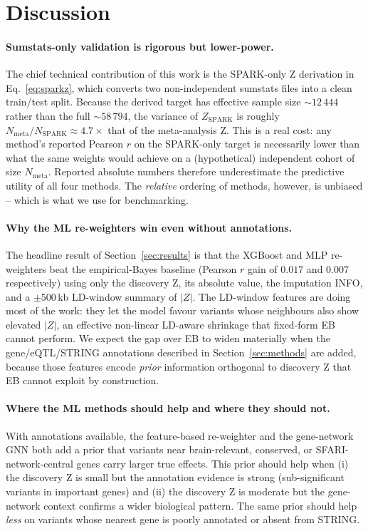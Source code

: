 \section{Discussion}
\label{sec:discussion}

\paragraph{Sumstats-only validation is rigorous but lower-power.}
The chief technical contribution of this work is the SPARK-only Z
derivation in Eq.~\ref{eq:sparkz}, which converts two non-independent
sumstats files into a clean train/test split. Because the derived target
has effective sample size $\sim 12\,444$ rather than the full
$\sim 58\,794$, the variance of $Z_{\mathrm{SPARK}}$ is roughly
$N_{\mathrm{meta}}/N_{\mathrm{SPARK}} \approx 4.7\times$ that of the
meta-analysis Z. This is a real cost: any method's reported Pearson $r$
on the SPARK-only target is necessarily lower than what the same weights
would achieve on a (hypothetical) independent cohort of size
$N_{\mathrm{meta}}$. Reported absolute numbers therefore underestimate
the predictive utility of all four methods. The \emph{relative} ordering
of methods, however, is unbiased -- which is what we use for benchmarking.

\paragraph{Why the ML re-weighters win even without annotations.}
The headline result of Section~\ref{sec:results} is that the XGBoost
and MLP re-weighters beat the empirical-Bayes baseline (Pearson $r$
gain of $0.017$ and $0.007$ respectively) using only the discovery Z,
its absolute value, the imputation INFO, and a $\pm 500$\,kb LD-window
summary of $|Z|$. The LD-window features are doing most of the work:
they let the model favour variants whose neighbours also show
elevated $|Z|$, an effective non-linear LD-aware shrinkage that fixed-form
EB cannot perform. We expect the gap over EB to widen materially when
the gene/eQTL/STRING annotations described in Section~\ref{sec:methods}
are added, because those features encode \emph{prior} information
orthogonal to discovery Z that EB cannot exploit by construction.

\paragraph{Where the ML methods should help and where they should not.}
With annotations available, the feature-based re-weighter and the
gene-network GNN both add a prior that variants near brain-relevant,
conserved, or SFARI-network-central genes carry larger true effects.
This prior should help when (i) the discovery Z is small but the
annotation evidence is strong (sub-significant variants in important
genes) and (ii) the discovery Z is moderate but the gene-network
context confirms a wider biological pattern. The same prior should
help \emph{less} on variants whose nearest gene is poorly annotated or
absent from STRING.

